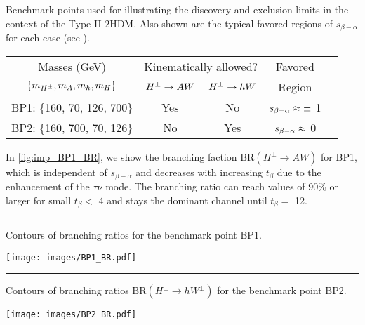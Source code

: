 \begin{table}
  \begin{sidecaption}{Benchmark points used for illustrating the discovery and exclusion limits in the context of the Type II $2$HDM. Also shown are the typical favored regions of $s_{\beta-\alpha}$ for each case (see \cite{Coleppa:2013dya}). } 
\begin{center}
 \begin{tabular}{ccccl}
 \toprule
 Masses (GeV) & \multicolumn{2}{c}{Kinematically allowed?} & Favored\\ \cmidrule{2-3}
 $\left\{ {m_{H^{\pm}},m_{A},m_{h},m_{H}}\right\}$ & $H^{\pm}\rightarrow A W$ & $H^{\pm}\rightarrow h W$ & Region\\\midrule
  BP1: \{160, 70, 126, 700\} & Yes & No & $s_{\beta-\alpha}\approx\pm$ 1 \\ \midrule
 BP2: \{160, 700, 70, 126\} & No & Yes & $s_{\beta-\alpha}\approx$ 0 \\
 \bottomrule
 \end{tabular}
\end{center}
\end{sidecaption}
\label{tab:classification}
\end{table}


In \autoref{fig:imp_BP1_BR}, we show the branching faction BR$(H^{\pm} \rightarrow AW)$ for BP1, which is independent of $s_{\beta-\alpha}$ and decreases with increasing $t_{\beta}$ due to the enhancement of the $\tau\nu$ mode. The branching ratio can reach values of 90\% or larger for small $t_{\beta}<$ 4 and stays the dominant channel until $t_{\beta}=$ 12. 

\begin{marginfigure}[-3in]
 \hrule
 \vspace{\onelineskip}
 \caption{Contours of branching ratios for the benchmark point BP1.}
 \texttt{[image: images/BP1\_BR.pdf]}
\label{fig:imp_BP1_BR}
\end{marginfigure}

\begin{marginfigure}
 \centering
 \hrule
 \vspace{\onelineskip}
\caption{Contours of branching ratios BR$(H^\pm\rightarrow hW^\pm)$ for the benchmark point BP2.}
\texttt{[image: images/BP2\_BR.pdf]}
\label{fig:imp_BP2_BR}
\end{marginfigure}

